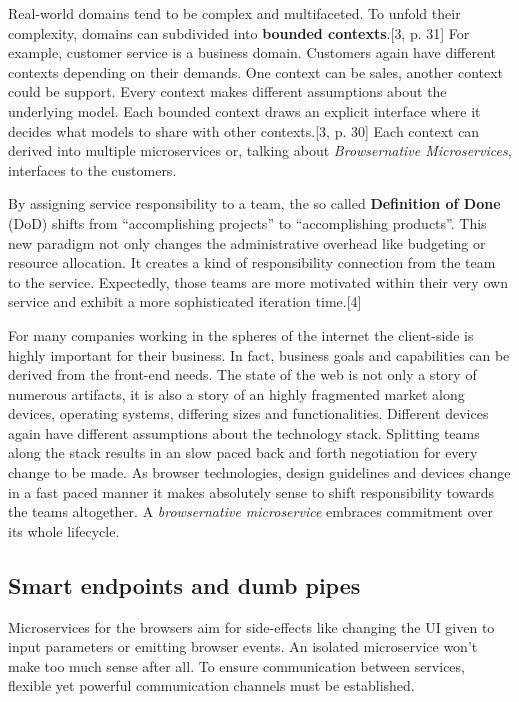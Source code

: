 \documentclass[]{article}
\begin{document}
Real-world domains tend to be complex and multifaceted. To unfold their
complexity, domains can subdivided into \textbf{bounded contexts}.{[}3,
p. 31{]} For example, customer service is a business domain. Customers
again have different contexts depending on their demands. One context
can be sales, another context could be support. Every context makes
different assumptions about the underlying model. Each bounded context
draws an explicit interface where it decides what models to share with
other contexts.{[}3, p. 30{]} Each context can derived into multiple
microservices or, talking about \emph{Browsernative Microservices},
interfaces to the customers.

By assigning service responsibility to a team, the so called
\textbf{Definition of Done} (DoD) shifts from ``accomplishing projects''
to ``accomplishing products''. This new paradigm not only changes the
administrative overhead like budgeting or resource allocation. It
creates a kind of responsibility connection from the team to the
service. Expectedly, those teams are more motivated within their very
own service and exhibit a more sophisticated iteration time.{[}4{]}

For many companies working in the spheres of the internet the
client-side is highly important for their business. In fact, business
goals and capabilities can be derived from the front-end needs. The
state of the web is not only a story of numerous artifacts, it is also a
story of an highly fragmented market along devices, operating systems,
differing sizes and functionalities. Different devices again have
different assumptions about the technology stack. Splitting teams along
the stack results in an slow paced back and forth negotiation for every
change to be made. As browser technologies, design guidelines and
devices change in a fast paced manner it makes absolutely sense to shift
responsibility towards the teams altogether. A \emph{browsernative
microservice} embraces commitment over its whole lifecycle.

\subsection{Smart endpoints and dumb
pipes}\label{smart-endpoints-and-dumb-pipes}

Microservices for the browsers aim for side-effects like changing the UI
given to input parameters or emitting browser events. An isolated
microservice won't make too much sense after all. To ensure
communication between services, flexible yet powerful communication
channels must be established.
\end{document}
